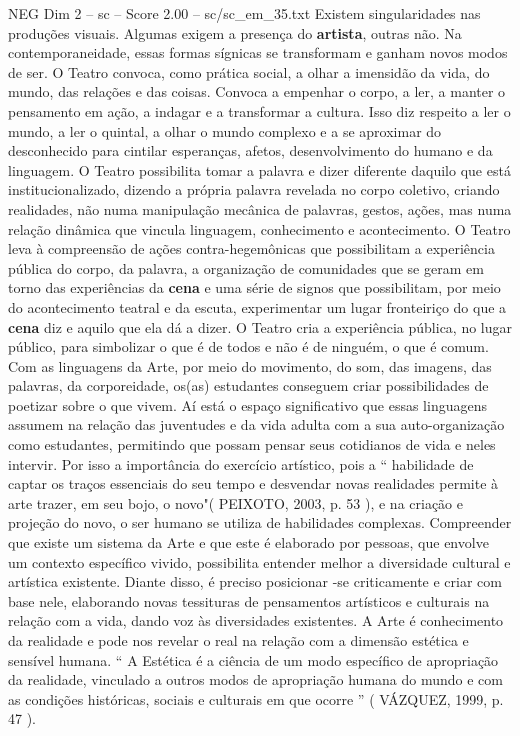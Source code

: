 \begin{textsample}{NEG Dim 2 – sc – Score 2.00 – sc/sc\_em\_35.txt}
Existem singularidades nas produções visuais.
Algumas exigem a presença do \textbf{artista}, outras não.
Na contemporaneidade, essas formas sígnicas se transformam e ganham novos modos de ser.
O Teatro convoca, como prática social, a olhar a imensidão da vida, do mundo, das relações e das coisas.
Convoca a empenhar o corpo, a ler, a manter o pensamento em ação, a indagar e a transformar a cultura.
Isso diz respeito a ler o mundo, a ler o quintal, a olhar o mundo complexo e a se aproximar do desconhecido para cintilar esperanças, afetos, desenvolvimento do humano e da linguagem.
O Teatro possibilita tomar a palavra e dizer diferente daquilo que está institucionalizado, dizendo a própria palavra revelada no corpo coletivo, criando realidades, não numa manipulação mecânica de palavras, gestos, ações, mas numa relação dinâmica que vincula linguagem, conhecimento e acontecimento.
O Teatro leva à compreensão de ações contra-hegemônicas que possibilitam a experiência pública do corpo, da palavra, a organização de comunidades que se geram em torno das experiências da \textbf{cena} e uma série de signos que possibilitam, por meio do acontecimento teatral e da escuta, experimentar um lugar fronteiriço do que a \textbf{cena} diz e aquilo que ela dá a dizer.
O Teatro cria a experiência pública, no lugar público, para simbolizar o que é de todos e não é de ninguém, o que é comum.
Com as linguagens da Arte, por meio do movimento, do som, das imagens, das palavras, da corporeidade, os(as) estudantes conseguem criar possibilidades de poetizar sobre o que vivem.
Aí está o espaço significativo que essas linguagens assumem na relação das juventudes e da vida adulta com a sua auto-organização como estudantes, permitindo que possam pensar seus cotidianos de vida e neles intervir.
Por isso a importância do exercício artístico, pois a “ habilidade de captar os traços essenciais do seu tempo e desvendar novas realidades permite à arte trazer, em seu bojo, o novo"( PEIXOTO, 2003, p. 53 ), e na criação e projeção do novo, o ser humano se utiliza de habilidades complexas.
Compreender que existe um sistema da Arte e que este é elaborado por pessoas, que envolve um contexto específico vivido, possibilita entender melhor a diversidade cultural e artística existente.
Diante disso, é preciso posicionar -se criticamente e criar com base nele, elaborando novas tessituras de pensamentos artísticos e culturais na relação com a vida, dando voz às diversidades existentes.
A Arte é conhecimento da realidade e pode nos revelar o real na relação com a dimensão estética e sensível humana. “ A Estética é a ciência de um modo específico de apropriação da realidade, vinculado a outros modos de apropriação humana do mundo e com as condições históricas, sociais e culturais em que ocorre ” ( VÁZQUEZ, 1999, p. 47 ).

\end{textsample}
